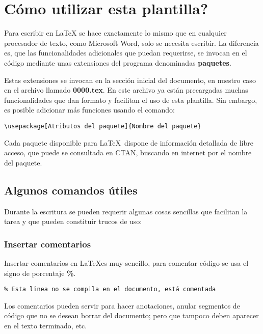 \chapter{Cómo utilizar esta plantilla?}
\par Para escribir en \LaTeX \; se hace exactamente lo mismo que en cualquier procesador de texto, como Microsoft Word, solo se necesita escribir. La diferencia es, que las funcionalidades adicionales que puedan requerirse, se invocan en el código mediante unas extensiones del programa denominadas \textbf{paquetes}.
\par Estas extensiones se invocan en la sección inicial del documento, en nuestro caso en el archivo llamado \textbf{0000.tex}. En este archivo ya están precargadas muchas funcionalidades que dan formato y facilitan el uso de esta plantilla. Sin embargo, es posible adicionar más funciones usando el comando:
\begin{verbatim}
\usepackage[Atributos del paquete]{Nombre del paquete}
\end{verbatim}
\par Cada paquete disponible para \LaTeX \, dispone de información detallada de libre acceso, que puede se consultada en CTAN, buscando en internet por el nombre del paquete.
\section{Algunos comandos útiles}
\par Durante la escritura se pueden requerir algunas cosas sencillas que facilitan la tarea y que pueden constituir trucos de uso:
\subsection{Insertar comentarios}
\par Insertar comentarios en \LaTeX es muy sencillo, para comentar código se usa el signo de porcentaje \textbf{\%}.
\begin{verbatim}
% Esta linea no se compila en el documento, está comentada
\end{verbatim}
\par Los comentarios pueden servir para hacer anotaciones, anular segmentos de código que no se desean borrar del documento; pero que tampoco deben aparecer en el texto terminado, etc.
\pagebreak
